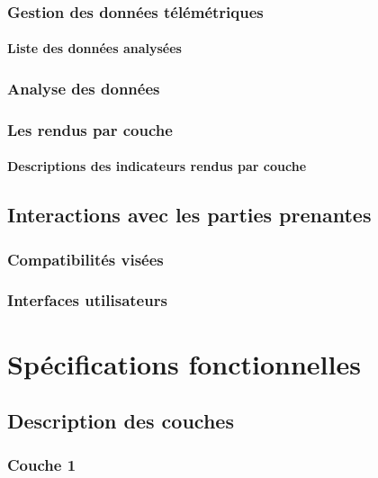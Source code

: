 \documentclass[a4paper,12pt]{report}
\begin{document}
\subsection{Gestion des données télémétriques}

\subsubsection{Liste des données analysées}

\subsection{Analyse des données}

\subsection{Les rendus par couche}

\subsubsection{Descriptions des indicateurs rendus par couche}

\section{Interactions avec les parties prenantes}

\subsection{Compatibilités visées}

\subsection{Interfaces utilisateurs}

\chapter{Spécifications fonctionnelles}

\section{Description des couches}

\subsection{Couche 1}
\end{document}
